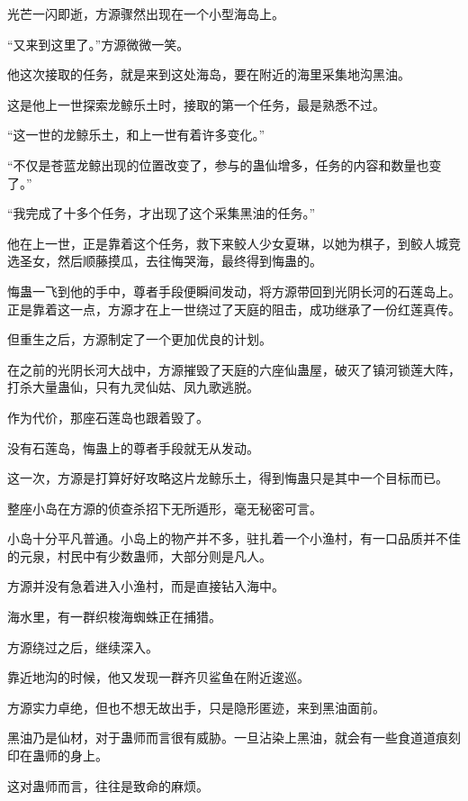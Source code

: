 
\begin{this_body}

光芒一闪即逝，方源骤然出现在一个小型海岛上。

“又来到这里了。”方源微微一笑。

他这次接取的任务，就是来到这处海岛，要在附近的海里采集地沟黑油。

这是他上一世探索龙鲸乐土时，接取的第一个任务，最是熟悉不过。

“这一世的龙鲸乐土，和上一世有着许多变化。”

“不仅是苍蓝龙鲸出现的位置改变了，参与的蛊仙增多，任务的内容和数量也变了。”

“我完成了十多个任务，才出现了这个采集黑油的任务。”

他在上一世，正是靠着这个任务，救下来鲛人少女夏琳，以她为棋子，到鲛人城竞选圣女，然后顺藤摸瓜，去往悔哭海，最终得到悔蛊的。

悔蛊一飞到他的手中，尊者手段便瞬间发动，将方源带回到光阴长河的石莲岛上。正是靠着这一点，方源才在上一世绕过了天庭的阻击，成功继承了一份红莲真传。

但重生之后，方源制定了一个更加优良的计划。

在之前的光阴长河大战中，方源摧毁了天庭的六座仙蛊屋，破灭了镇河锁莲大阵，打杀大量蛊仙，只有九灵仙姑、凤九歌逃脱。

作为代价，那座石莲岛也跟着毁了。

没有石莲岛，悔蛊上的尊者手段就无从发动。

这一次，方源是打算好好攻略这片龙鲸乐土，得到悔蛊只是其中一个目标而已。

整座小岛在方源的侦查杀招下无所遁形，毫无秘密可言。

小岛十分平凡普通。小岛上的物产并不多，驻扎着一个小渔村，有一口品质并不佳的元泉，村民中有少数蛊师，大部分则是凡人。

方源并没有急着进入小渔村，而是直接钻入海中。

海水里，有一群织梭海蜘蛛正在捕猎。

方源绕过之后，继续深入。

靠近地沟的时候，他又发现一群齐贝鲨鱼在附近逡巡。

方源实力卓绝，但也不想无故出手，只是隐形匿迹，来到黑油面前。

黑油乃是仙材，对于蛊师而言很有威胁。一旦沾染上黑油，就会有一些食道道痕刻印在蛊师的身上。

这对蛊师而言，往往是致命的麻烦。


\end{this_body}
